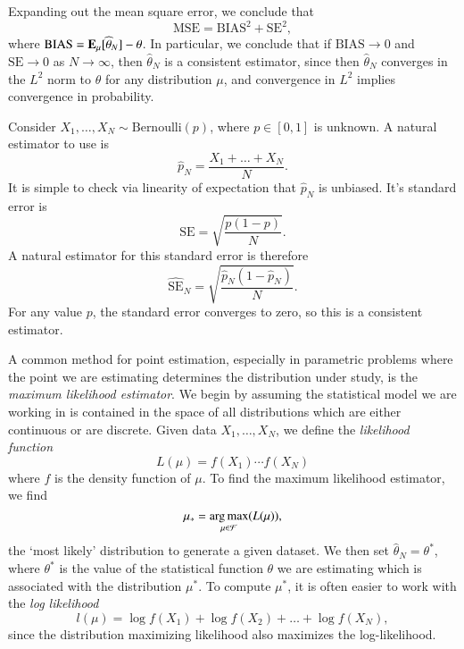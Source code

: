 Expanding out the mean square error, we conclude that
%
\[ \text{MSE} = \text{BIAS}^2 + \text{SE}^2, \]
%
where $\text{BIAS} = \operatorname{\mathbf{E}}_\mu[ \widehat{\theta}_N ] - \theta$. In particular, we conclude that if $\text{BIAS} \to 0$ and $\text{SE} \to 0$ as $N \to \infty$, then $\widehat{\theta}_N$ is a consistent estimator, since then $\widehat{\theta}_N$ converges in the $L^2$ norm to $\theta$ for any distribution $\mu$, and convergence in $L^2$ implies convergence in probability.

\begin{example}
	Consider $X_1,\dots,X_N \sim \text{Bernoulli}(p)$, where $p \in [0,1]$ is unknown. A natural estimator to use is
	\[ \widehat{p}_N = \frac{X_1 + \dots + X_N}{N}. \]
	It is simple to check via linearity of expectation that $\widehat{p}_N$ is unbiased. It's standard error is
	\[ \text{SE} = \sqrt{\frac{p(1-p)}{N}}. \]
	A natural estimator for this standard error is therefore
	\[ \widehat{\text{SE}}_N = \sqrt{\frac{\widehat{p}_N (1 - \widehat{p}_N)}{N}}. \]
	For any value $p$, the standard error converges to zero, so this is a consistent estimator.
\end{example}

A common method for point estimation, especially in parametric problems where the point we are estimating determines the distribution under study, is the \emph{maximum likelihood estimator}. We begin by assuming the statistical model we are working in is contained in the space of all distributions which are either continuous or are discrete. Given data $X_1,\dots,X_N$, we define the \emph{likelihood function}
%
\[ L(\mu) = f(X_1) \cdots f(X_N) \]
%
where $f$ is the density function of $\mu$. To find the maximum likelihood estimator, we find
%
\[ \mu_* = \operatorname*{arg\,max}_{\mu \in \mathcal{F}}(L(\mu)), \]
%
the `most likely' distribution to generate a given dataset. We then set $\widehat{\theta}_N = \theta^*$, where $\theta^*$ is the value of the statistical function $\theta$ we are estimating which is associated with the distribution $\mu^*$. To compute $\mu^*$, it is often easier to work with the \emph{log likelihood}
%
\[ l(\mu) = \log f(X_1) + \log f(X_2) + \dots + \log f(X_N), \]
%
since the distribution maximizing likelihood also maximizes the log-likelihood.

